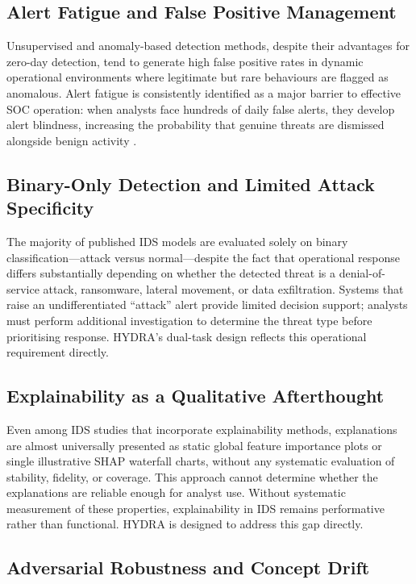 \documentclass[12pt,a4paper]{report}
\begin{document}
\subsection{Alert Fatigue and False Positive Management}
\label{sec:alert-fatigue}

Unsupervised and anomaly-based detection methods, despite their advantages for zero-day detection, tend to generate high false positive rates in dynamic operational environments where legitimate but rare behaviours are flagged as anomalous. Alert fatigue is consistently identified as a major barrier to effective SOC operation: when analysts face hundreds of daily false alerts, they develop alert blindness, increasing the probability that genuine threats are dismissed alongside benign activity \citep{dang2023}.

\subsection{Binary-Only Detection and Limited Attack Specificity}
\label{sec:binary-only}

The majority of published IDS models are evaluated solely on binary classification---attack versus normal---despite the fact that operational response differs substantially depending on whether the detected threat is a denial-of-service attack, ransomware, lateral movement, or data exfiltration. Systems that raise an undifferentiated ``attack'' alert provide limited decision support; analysts must perform additional investigation to determine the threat type before prioritising response. HYDRA's dual-task design reflects this operational requirement directly.

\subsection{Explainability as a Qualitative Afterthought}
\label{sec:xai-afterthought}

Even among IDS studies that incorporate explainability methods, explanations are almost universally presented as static global feature importance plots or single illustrative SHAP waterfall charts, without any systematic evaluation of stability, fidelity, or coverage. This approach cannot determine whether the explanations are reliable enough for analyst use. Without systematic measurement of these properties, explainability in IDS remains performative rather than functional. HYDRA is designed to address this gap directly.

\subsection{Adversarial Robustness and Concept Drift}
\label{sec:adversarial}
\end{document}
